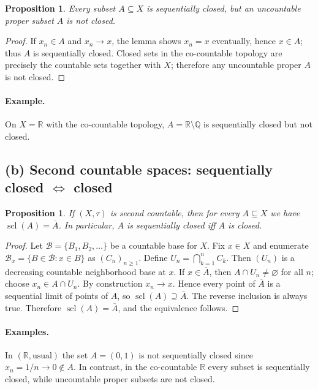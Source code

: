\documentclass[12pt,a4paper]{article}
\theoremstyle{plain}
\newtheorem{proposition}[theorem]{Proposition}
\theoremstyle{definition}
\theoremstyle{remark}
\theoremstyle{remark}
\begin{document}
	\begin{proposition}
		Every subset $A\subseteq X$ is sequentially closed, but an uncountable proper subset $A$ is not closed.
	\end{proposition}
	\begin{proof}
		If $x_n\in A$ and $x_n\to x$, the lemma shows $x_n=x$ eventually, hence $x\in A$; thus $A$ is sequentially closed.
		Closed sets in the co-countable topology are precisely the countable sets together with $X$; therefore any uncountable proper $A$ is not closed.
	\end{proof}
	
	\paragraph{Example.}
	On $X=\mathbb{R}$ with the co-countable topology, $A=\mathbb{R}\setminus\mathbb{Q}$ is sequentially closed but not closed.
	
	\subsection*{(b) Second countable spaces: sequentially closed $\Leftrightarrow$ closed}
	\begin{proposition}
		If $(X,\tau)$ is second countable, then for every $A\subseteq X$ we have $\operatorname{scl}(A)=\overline{A}$. In particular, $A$ is sequentially closed iff $A$ is closed.
	\end{proposition}
	\begin{proof}
		Let $\mathcal{B}=\{B_1,B_2,\dots\}$ be a countable base for $X$. Fix $x\in X$ and enumerate $\mathcal{B}_x=\{B\in\mathcal{B}: x\in B\}$ as $(C_n)_{n\ge1}$.
		Define $U_n=\bigcap_{k=1}^n C_k$. Then $(U_n)$ is a decreasing countable neighborhood base at $x$.
		If $x\in\overline{A}$, then $A\cap U_n\neq\varnothing$ for all $n$; choose $x_n\in A\cap U_n$.
		By construction $x_n\to x$. Hence every point of $\overline{A}$ is a sequential limit of points of $A$, so $\operatorname{scl}(A)\supseteq\overline{A}$.
		The reverse inclusion is always true. Therefore $\operatorname{scl}(A)=\overline{A}$, and the equivalence follows.
	\end{proof}
	
	\paragraph{Examples.}
	In $(\mathbb{R},\text{usual})$ the set $A=(0,1)$ is not sequentially closed since $x_n=1/n\to 0\notin A$.
	In contrast, in the co-countable $\mathbb{R}$ every subset is sequentially closed, while uncountable proper subsets are not closed.
	
\end{document}
